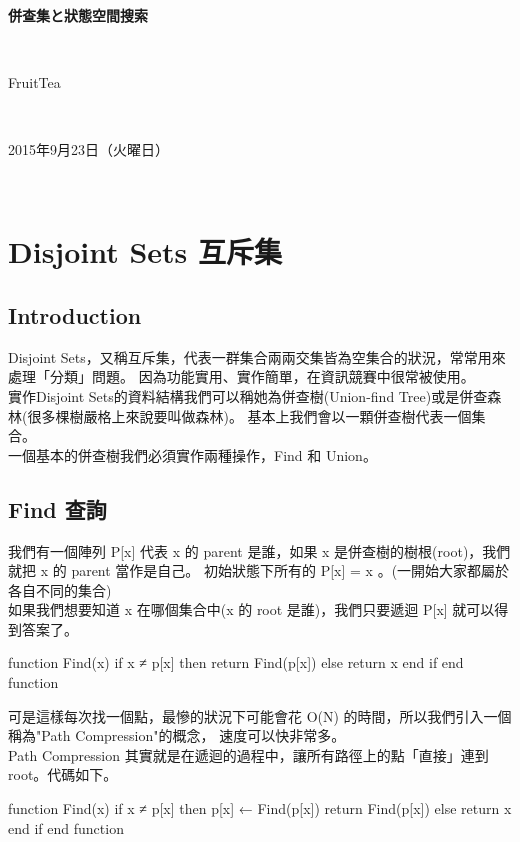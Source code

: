 \documentclass{article}
\title{\hmwkClass}
\author{\hmwkAuthorName}
\date{\hmwkDueDate}
\def\normalsize{\fontsize{12}{16}\selectfont}
\def\large{\fontsize{16}{24}\selectfont}
\def\LARGE{\fontsize{24}{36}\selectfont}
\newcommand{\hmwkDueDate}{2015年9月23日（火曜日）} %
\newcommand{\hmwkClass}{併查集と狀態空間搜索} %
\newcommand{\hmwkAuthorName}{FruitTea} %
\begin{document}
\LARGE~\\[4ex]
\centerline{\bf\hmwkClass}\large\\[2ex]\centerline{\hmwkAuthorName}\\[2ex]\centerline{\hmwkDueDate}\\
\normalsize

\section{Disjoint Sets 互斥集}
\subsection*{Introduction}
Disjoint Sets，又稱互斥集，代表一群集合兩兩交集皆為空集合的狀況，常常用來處理「分類」問題。
因為功能實用、實作簡單，在資訊競賽中很常被使用。\\
實作Disjoint Sets的資料結構我們可以稱她為併查樹(Union-find Tree)或是併查森林(很多棵樹嚴格上來說要叫做森林)。
基本上我們會以一顆併查樹代表一個集合。\\
一個基本的併查樹我們必須實作兩種操作，Find 和 Union。

\subsection{Find 查詢}
我們有一個陣列 P[x] 代表 x 的 parent 是誰，如果 x 是併查樹的樹根(root)，我們就把 x 的 parent 當作是自己。
初始狀態下所有的 P[x] = x 。(一開始大家都屬於各自不同的集合)\\
如果我們想要知道 x 在哪個集合中(x 的 root 是誰)，我們只要遞迴 P[x] 就可以得到答案了。

\begin{algorithm}[caption={Find}, label={alg1}]
function Find(x)
    if x ≠ p[x] then
        return Find(p[x])
    else
        return x
    end if
end function
\end{algorithm}

可是這樣每次找一個點，最慘的狀況下可能會花 O(N) 的時間，所以我們引入一個稱為"Path Compression"的概念，
速度可以快非常多。\\
Path Compression 其實就是在遞迴的過程中，讓所有路徑上的點「直接」連到root。代碼如下。

\begin{algorithm}[caption={Find \& Path Compression}, label={alg1}]
function Find(x)
    if x ≠ p[x] then
        p[x] ← Find(p[x])
        return Find(p[x])
    else
        return x
    end if
end function
\end{algorithm}
\end{document}
